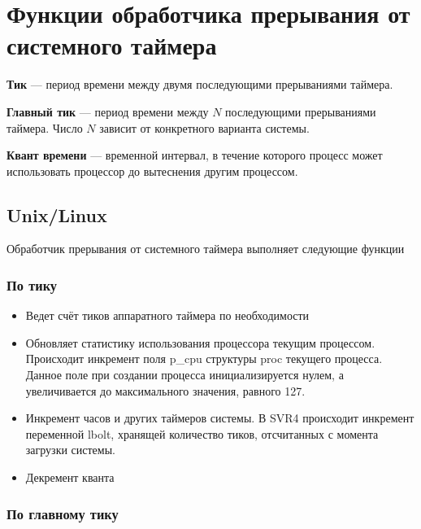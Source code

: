 \chapter{Функции обработчика прерывания от системного таймера}

    \textbf{Тик} --- период времени между двумя последующими прерываниями таймера.
    
    \textbf{Главный тик} --- период времени между \(N\) последующими прерываниями таймера. Число \(N\) зависит от конкретного варианта системы.

    \textbf{Квант времени} --- временной интервал, в течение которого процесс может использовать процессор до вытеснения другим процессом.

    \section{Unix/Linux}
    
        Обработчик прерывания от системного таймера выполняет следующие функции
    
        \subsection{По тику}
        
            \begin{itemize}
                \item Ведет счёт тиков аппаратного таймера по необходимости
                \item Обновляет статистику использования процессора текущим процессом.  Происходит инкремент поля p\_cpu структуры proc текущего процесса. Данное поле при создании процесса инициализируется нулем, а увеличивается до максимального значения, равного 127.
                \item Инкремент часов и других таймеров системы. В SVR4 происходит инкремент переменной lbolt, хранящей количество тиков, отсчитанных с момента загрузки системы.
                \item Декремент кванта
            \end{itemize}
        
        \subsection{По главному тику}
        
